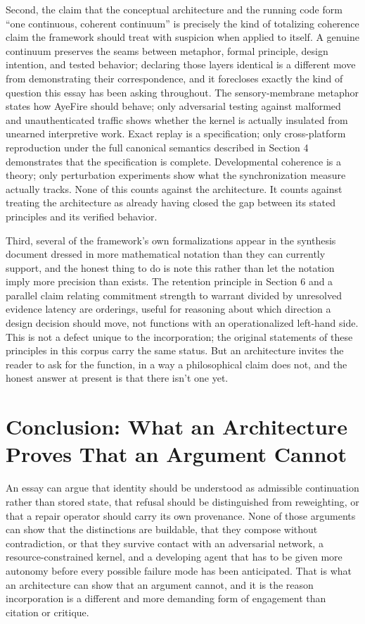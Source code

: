 \documentclass[11pt]{article}
\begin{document}
Second, the claim that the conceptual architecture and the running code form ``one continuous, coherent continuum'' is precisely the kind of totalizing coherence claim the framework should treat with suspicion when applied to itself. A genuine continuum preserves the seams between metaphor, formal principle, design intention, and tested behavior; declaring those layers identical is a different move from demonstrating their correspondence, and it forecloses exactly the kind of question this essay has been asking throughout. The sensory-membrane metaphor states how AyeFire should behave; only adversarial testing against malformed and unauthenticated traffic shows whether the kernel is actually insulated from unearned interpretive work. Exact replay is a specification; only cross-platform reproduction under the full canonical semantics described in Section 4 demonstrates that the specification is complete. Developmental coherence is a theory; only perturbation experiments show what the synchronization measure actually tracks. None of this counts against the architecture. It counts against treating the architecture as already having closed the gap between its stated principles and its verified behavior.

Third, several of the framework's own formalizations appear in the synthesis document dressed in more mathematical notation than they can currently support, and the honest thing to do is note this rather than let the notation imply more precision than exists. The retention principle in Section 6 and a parallel claim relating commitment strength to warrant divided by unresolved evidence latency are orderings, useful for reasoning about which direction a design decision should move, not functions with an operationalized left-hand side. This is not a defect unique to the incorporation; the original statements of these principles in this corpus carry the same status. But an architecture invites the reader to ask for the function, in a way a philosophical claim does not, and the honest answer at present is that there isn't one yet.

\section{Conclusion: What an Architecture Proves That an Argument Cannot}

An essay can argue that identity should be understood as admissible continuation rather than stored state, that refusal should be distinguished from reweighting, or that a repair operator should carry its own provenance. None of those arguments can show that the distinctions are buildable, that they compose without contradiction, or that they survive contact with an adversarial network, a resource-constrained kernel, and a developing agent that has to be given more autonomy before every possible failure mode has been anticipated. That is what an architecture can show that an argument cannot, and it is the reason incorporation is a different and more demanding form of engagement than citation or critique.
\end{document}
